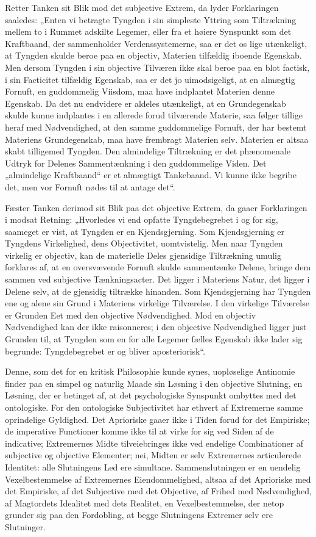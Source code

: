 \documentclass[12pt]{book}
\newcommand{\opage}[1]{\marginnote{\footnotesize\textit{[#1]}}}
\begin{document}
Retter Tanken sit Blik mod det subjective Extrem, da lyder Forklaringen saaledes: „Enten vi betragte Tyngden i sin simpleste Yttring som Tiltrækning mellem to i Rummet adskilte Legemer, eller fra et høiere Synspunkt som det Kraftbaand, der sammenholder Verdenssystemerne, saa er det os lige utænkeligt, at Tyngden skulde beroe paa en objectiv, Materien tilfældig iboende Egenskab. Men dersom Tyngden i sin objective Tilværen ikke skal beroe paa en blot factisk, i sin Facticitet tilfældig Egenskab, saa er det jo uimodsigeligt, at en almægtig Fornuft, en guddommelig Viisdom, maa have indplantet Materien denne Egenskab. Da det nu endvidere er aldeles utænkeligt, at en Grundegenskab skulde kunne indplantes i en allerede forud tilværende Materie, saa følger tillige heraf med Nødvendighed, at den samme guddommelige Fornuft, der har bestemt Materiens Grundegenskab, maa have frembragt Materien selv. Materien er altsaa skabt tilligemed Tyngden. Den almindelige Tiltrækning er det phænomenale Udtryk for Delenes Sammentænkning i den guddommelige Viden. Det „almindelige Kraftbaand“ er et almægtigt Tankebaand. Vi kunne ikke begribe det, men vor Fornuft nødes til at antage det“.

Fæster Tanken derimod sit Blik paa det objective Extrem, da gaaer Forklaringen i modsat Retning: „Hvorledes vi end opfatte Tyngdebegrebet i og for sig, saameget er vist, at Tyngden er en Kjendsgjerning. Som Kjendsgjerning er Tyngdens Virkelighed, dens Objectivitet, uomtvistelig. Men naar Tyngden virkelig er objectiv, kan de materielle Deles gjensidige Tiltrækning umulig forklares af, at en oversvævende Fornuft skulde sammentænke Delene, bringe dem sammen ved subjective Tænkningsacter. Det ligger i Materiens Natur, det ligger i Delene selv, at de gjensidig tiltrække hinanden.
\opage{414}Som Kjendsgjerning har Tyngden ene og alene sin Grund i Materiens virkelige Tilværelse. I den virkelige Tilværelse er Grunden Eet med den objective Nødvendighed. Mod en objectiv Nødvendighed kan der ikke raisonneres; i den objective Nødvendighed ligger just Grunden til, at Tyngden som en for alle Legemer fælles Egenskab ikke lader sig begrunde: Tyngdebegrebet er og bliver aposteriorisk“.

Denne, som det for en kritisk Philosophie kunde synes, uopløselige Antinomie finder paa en simpel og naturlig Maade sin Løsning i den objective Slutning, en Løsning, der er betinget af, at det psychologiske Synspunkt ombyttes med det ontologiske. For den ontologiske Subjectivitet har ethvert af Extremerne samme oprindelige Gyldighed. Det Aprioriske gaaer ikke i Tiden forud for det Empiriske; de imperative Functioner komme ikke til at virke for sig ved Siden af de indicative; Extremernes Midte tilveiebringes ikke ved endelige Combinationer af subjective og objective Elementer; nei, Midten er selv Extremernes articulerede Identitet: alle Slutningens Led ere simultane. Sammenslutningen er en uendelig Vexelbestemmelse af Extremernes Eiendommelighed, altsaa af det Aprioriske med det Empiriske, af det Subjective med det Objective, af Frihed med Nødvendighed, af Magtordets Idealitet med dets Realitet, en Vexelbestemmelse, der netop grunder sig paa den Fordobling, at begge Slutningens Extremer selv ere Slutninger.
\end{document}

